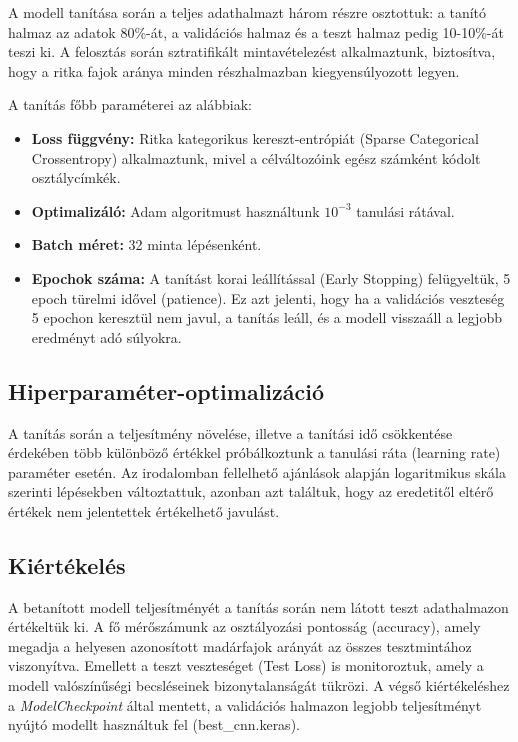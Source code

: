 \documentclass[journal]{IEEEtran}
\begin{document}
  A modell tanítása során a teljes adathalmazt három részre osztottuk: a tanító halmaz az adatok 80\%-át, a validációs halmaz és a teszt halmaz pedig 10-10\%-át teszi ki. A felosztás során sztratifikált mintavételezést alkalmaztunk, biztosítva, hogy a ritka fajok aránya minden részhalmazban kiegyensúlyozott legyen.

  A tanítás főbb paraméterei az alábbiak:
  \begin{itemize}
    \item \textbf{Loss függvény:} Ritka kategorikus kereszt-entrópiát (Sparse Categorical Crossentropy) alkalmaztunk, mivel a célváltozóink egész számként kódolt osztálycímkék.
    \item \textbf{Optimalizáló:} Adam algoritmust használtunk $10^{-3}$ tanulási rátával.
    \item \textbf{Batch méret:} 32 minta lépésenként.
    \item \textbf{Epochok száma:} A tanítást korai leállítással (Early Stopping) felügyeltük, 5 epoch türelmi idővel (patience). Ez azt jelenti, hogy ha a validációs veszteség 5 epochon keresztül nem javul, a tanítás leáll, és a modell visszaáll a legjobb eredményt adó súlyokra.
  \end{itemize}

 \subsection{Hiperparaméter-optimalizáció}

 A tanítás során a teljesítmény növelése, illetve a tanítási idő csökkentése érdekében több különböző értékkel próbálkoztunk a tanulási ráta (learning rate) paraméter esetén. Az irodalomban fellelhető ajánlások alapján logaritmikus skála szerinti lépésekben változtattuk, azonban azt találtuk, hogy az eredetitől eltérő értékek nem jelentettek értékelhető javulást.
 
 \subsection{Kiértékelés}
 
  A betanított modell teljesítményét a tanítás során nem látott teszt adathalmazon értékeltük ki. A fő mérőszámunk az osztályozási pontosság (accuracy), amely megadja a helyesen azonosított madárfajok arányát az összes tesztmintához viszonyítva. Emellett a teszt veszteséget (Test Loss) is monitoroztuk, amely a modell valószínűségi becsléseinek bizonytalanságát tükrözi. A végső kiértékeléshez a \emph{ModelCheckpoint} által mentett, a validációs halmazon legjobb teljesítményt nyújtó modellt használtuk fel (best\_cnn.keras).
\end{document}
